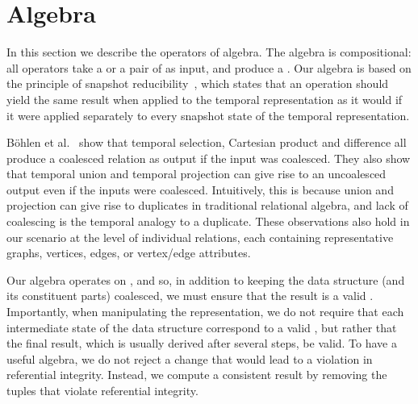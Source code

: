 \section{Algebra}
\label{sec:algebra}
\setlength{\textfloatsep}{5pt}%

In this section we describe the operators of \tg algebra.  The algebra
is compositional: all operators take a \tg or a pair of \tgs as
input, and produce a \tg.  Our algebra is based on the principle of
snapshot reducibility~\cite{DBLP:reference/db/Bohlen092}, which states
that an operation should yield the same result when applied to the
temporal representation as it would if it were applied separately to
every snapshot state of the temporal representation.


B\"ohlen et al.~\cite{DBLP:conf/vldb/BohlenSS96} show that temporal
selection, Cartesian product and difference all produce a coalesced
relation as output if the input was coalesced.  They also show that
temporal union and temporal projection can give rise to an uncoalesced
output even if the inputs were coalesced.  Intuitively, this is
because union and projection can give rise to duplicates in
traditional relational algebra, and lack of coalescing is the temporal
analogy to a duplicate.
%
These observations also hold in our scenario at the level of
individual relations, each containing representative graphs, vertices,
edges, or vertex/edge attributes.

Our algebra operates on \tgs, and so, in addition to keeping the data
structure (and its constituent parts) coalesced, we must ensure that
the result is a valid \tg.  Importantly, when manipulating the \ve
representation, we do not require that each intermediate state of the
data structure correspond to a valid \tg, but rather that the final
result, which is usually derived after several steps, be valid.  To
have a useful algebra, we do not reject a change that would lead to a
violation in referential integrity.  Instead, we compute a consistent
result by removing the tuples that violate referential integrity.

